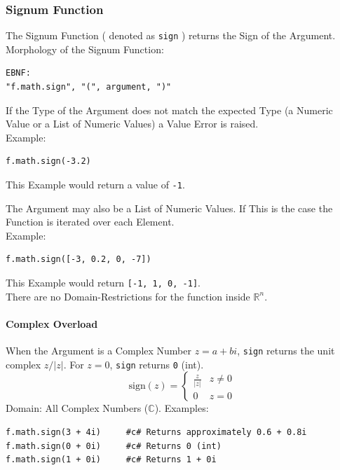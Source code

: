 \subsubsection{Signum Function}
The Signum Function ( denoted as \texttt{sign} ) returns the Sign of the Argument. \\
Morphology of the Signum Function:
\begin{verbatim}
EBNF:
"f.math.sign", "(", argument, ")"
\end{verbatim}
If the Type of the Argument does not match the expected Type (a Numeric Value or a List of Numeric Values) a Value Error is raised.\\
Example:
\begin{verbatim}
f.math.sign(-3.2)
\end{verbatim}
This Example would return a value of \texttt{-1}.

The Argument may also be a List of Numeric Values. If This is the case the Function is iterated over each Element.\\
Example:
\begin{verbatim}
f.math.sign([-3, 0.2, 0, -7])
\end{verbatim}
This Example would return \texttt{[-1, 1, 0, -1]}.\\
There are no Domain-Restrictions for the function inside $\mathbb{R}^n$.

\paragraph{Complex Overload}
When the Argument is a Complex Number $z = a + bi$, \texttt{sign} returns the unit complex $z / |z|$. For $z = 0$, \texttt{sign} returns \texttt{0} (int).
\[
\text{sign}(z) = \begin{cases} \frac{z}{|z|} & z \neq 0 \\ 0 & z = 0 \end{cases}
\]
Domain: All Complex Numbers ($\mathbb{C}$).
Examples:
\begin{verbatim}
f.math.sign(3 + 4i)     #c# Returns approximately 0.6 + 0.8i
f.math.sign(0 + 0i)     #c# Returns 0 (int)
f.math.sign(1 + 0i)     #c# Returns 1 + 0i
\end{verbatim}


